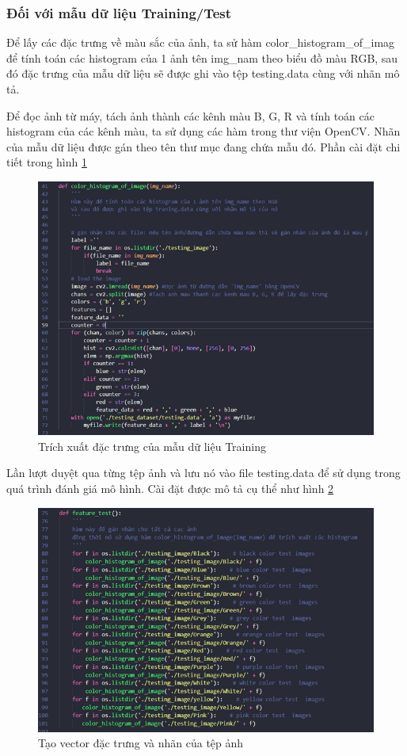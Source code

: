 \documentclass[../BTL.tex]{subfiles}
\begin{document}
\subsubsection{Đối với mẫu dữ liệu Training/Test}
Để lấy các đặc trưng về màu sắc của ảnh, ta sử  hàm color\_histogram\_of\_imag để tính toán các histogram của 1 ảnh tên img\_nam theo biểu đồ màu RGB, sau đó đặc trưng của mẫu dữ liệu sẽ được ghi vào tệp testing.data cùng với nhãn mô tả. 

Để đọc ảnh từ máy, tách ảnh thành các kênh màu B, G, R và tính toán các histogram của các kênh màu, ta sử dụng các hàm trong thư viện OpenCV. Nhãn của mẫu dữ liệu được gán theo tên thư mục đang chứa mẫu đó. Phần cài đặt chi tiết trong hình \ref{fig:train_data}

\begin{figure}[H]
    \centering
    \includegraphics[scale=0.85]{BTL BaoCao Latex TTNT/Anh/trích xuất đặc trưng của file training.png}
    \captionsetup{justification=centering}
    \caption{Trích xuất đặc trưng của mẫu dữ liệu Training}
    \label{fig:train_data}
\end{figure}
Lần lượt duyệt qua từng tệp ảnh và lưu nó vào file testing.data để sử dụng trong quá trình đánh giá mô hình. Cài đặt được mô tả cụ thể như hình \ref{fig:data_label}
\begin{figure}[H]
    \centering
    \includegraphics[scale = 0.85]{BTL BaoCao Latex TTNT/Anh/tiền xử lý.png}
    \caption{Tạo vector đặc trưng và nhãn của tệp ảnh}
    \label{fig:data_label}
\end{figure}
\end{document}
